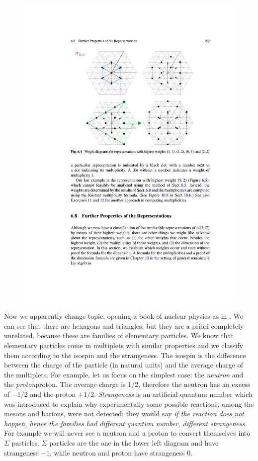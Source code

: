 \documentclass[../main.tex]{subfiles}
\begin{document}
\begin{figure}[h!]
	\includegraphics{images/hall_169_c.pdf}
	\caption[]{}
\end{figure}
Now we apparently change topic, opening a book of nuclear physics  as in . We can see that there are hexagons and triangles, but they are a priori completely unrelated, because these are families of elementary particles. We know that elementary particles come in multiplets with similar properties and we classify them according to the isospin and the strangeness. The isospin is the difference between the charge of the particle (in natural units) and the average charge of the multiplets. For example, let us focus on the simplest case: the \textit{neutron} and the \textit{proton}proton. The average charge is $1/2$, therefore the neutron has an excess of $-1/2$ and the proton $+1/2$. \textit{Strangeness} is an artificial quantum number which was introduced to explain why experimentally some possible reactions, among the mesons and barions, were not detected: they would say \textit{if the reaction does not happen, hence the families had different quantum number, different strangeness.} For example we will never see a neutron and a proton to convert themselves into $\Sigma$ particles. $\Sigma$ particles are the one in the lower left diagram and have strangeness $-1$, while neutron and proton have strangeness $0$.
\end{document}
